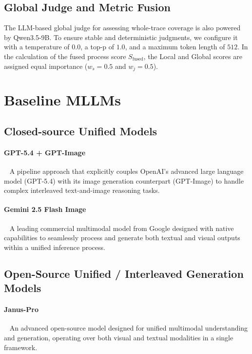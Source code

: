 \documentclass[11pt]{article}
\begin{document}
\subsection{Global Judge and Metric Fusion}

The LLM-based global judge for assessing whole-trace coverage is also powered by Qwen3.5-9B. To ensure stable and deterministic judgments, we configure it with a temperature of $0.0$, a top-p of $1.0$, and a maximum token length of $512$. In the calculation of the fused process score $S_{\text{fused}}$, the Local and Global scores are assigned equal importance ($w_s = 0.5$ and $w_j = 0.5$).

\section{Baseline MLLMs}
\label{sec:appendix_models}

\subsection{Closed-source Unified Models}

\paragraph{GPT-5.4 + GPT-Image}~\cite{openai_gpt54_2026,openai_gpt_image_1} A pipeline approach that explicitly couples OpenAI's advanced large language model (GPT-5.4) with its image generation counterpart (GPT-Image) to handle complex interleaved text-and-image reasoning tasks.

\paragraph{Gemini 2.5 Flash Image}~\cite{google_gemini25_flash_image_2025} A leading commercial multimodal model from Google designed with native capabilities to seamlessly process and generate both textual and visual outputs within a unified inference process.

\subsection{Open-Source Unified / Interleaved Generation Models}

\paragraph{Janus-Pro}~\cite{janus} An advanced open-source model designed for unified multimodal understanding and generation, operating over both visual and textual modalities in a single framework.
\end{document}
